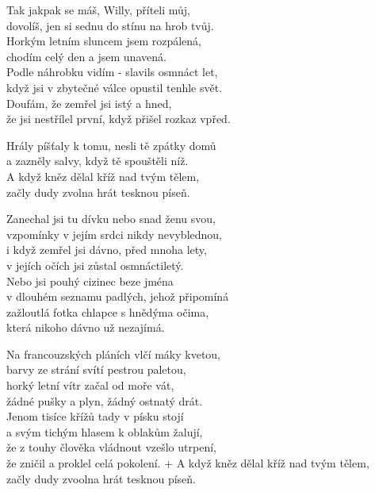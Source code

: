\thispagestyle{empty}

\vspace{-5px}
\ve{}
Tak jakpak se máš, Willy, příteli můj,\\
dovolíš, jen si sednu do stínu na hrob tvůj.\\
Horkým letním sluncem jsem rozpálená,\\
chodím celý den a jsem unavená.\\
Podle náhrobku vidím - slavils osmnáct let,\\
když jsi v zbytečné válce opustil tenhle svět.\\
Doufám, že zemřel jsi istý a hned,\\
že jsi nestřílel první, když přišel rozkaz vpřed.

\vspace{-5px}
\cho{}
Hrály píšťaly k tomu, nesli tě zpátky domů\\
a zazněly salvy, když tě spouštěli níž.\\
A když kněz dělal kříž nad tvým tělem,\\
začly dudy zvolna hrát tesknou píseň.

\vspace{-5px}
\ve{}
Zanechal jsi tu dívku nebo snad ženu svou,\\
vzpomínky v jejím srdci nikdy nevyblednou,\\
i když zemřel jsi dávno, před mnoha lety,\\
v jejích očích jsi zůstal osmnáctiletý.\\
Nebo jsi pouhý cizinec beze jména\\
v dlouhém seznamu padlých, jehož připomíná\\
zažloutlá fotka chlapce s hnědýma očima,\\
která nikoho dávno už nezajímá.

\vspace{-5px}
\cho
\vspace{-5px}

\ve{}
Na francouzských pláních vlčí máky kvetou,\\
barvy ze strání svítí pestrou paletou,\\
horký letní vítr začal od moře vát,\\
žádné pušky a plyn, žádný ostnatý drát.\\
Jenom tisíce křížů tady v písku stojí\\
a svým tichým hlasem k oblakům žalují,\\
že z touhy člověka vládnout vzešlo utrpení,\\
že zničil a proklel celá pokolení.
\vspace{-5px}
\cho{}
\vspace{-10px}
\re{}
+ A když kněz dělal kříž nad tvým tělem,\\
začly dudy zvoolna hrát tesknou píseň.

\esong
\restoregeometry{}